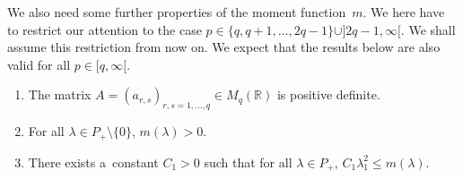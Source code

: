 We also need some further properties of the moment function~$m$.
We here have to restrict our attention to the case $p\in \{q,q+1,\ldots,2q-1\}\cup]2q-1,\infty[$.
We shall assume this restriction from now on.
We expect that the results below are also valid for all $p\in[q,\infty[$.

\begin{Lemma}\label{quad-wachstum}\qquad
\begin{enumerate}\itemsep=0pt
\item[$(1)$] The matrix $A=(a_{r,s})_{r,s=1,\ldots,q}\in M_q(\mathbb R)$ is positive definite.
\item[$(2)$] For all $\lambda\in P_+\setminus\{0\}$, $m(\lambda)>0$.
\item[$(3)$] There exists a~constant $C_1>0$ such that for all $\lambda\in P_+$, $C_1\lambda_1^2\le m(\lambda)$.
\end{enumerate}
\end{Lemma}

